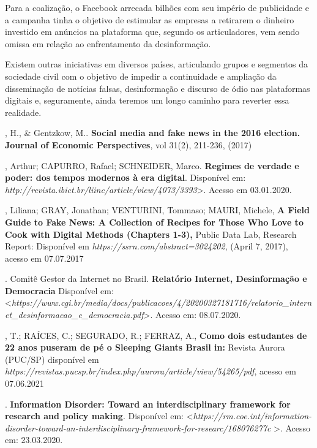 Para a coalização, o Facebook arrecada bilhões com seu império de
publicidade e a campanha tinha o objetivo de estimular as empresas a
retirarem o dinheiro investido em anúncios na plataforma que, segundo os
articuladores, vem sendo omissa em relação ao enfrentamento da
desinformação.

Existem outras iniciativas em diversos países, articulando grupos e
segmentos da sociedade civil com o objetivo de impedir a continuidade e
ampliação da disseminação de notícias falsas, desinformação e discurso
de ódio nas plataformas digitais e, seguramente, ainda teremos um longo
caminho para reverter essa realidade.


\begin{bibliohedra}
, H., \& Gentzkow, M.. \textbf{Social media and fake news in the
2016 election. Journal of Economic Perspectives}, vol 31(2), 211-236,
(2017)

, Arthur; CAPURRO, Rafael; SCHNEIDER, Marco. \textbf{Regimes de
verdade e poder: dos tempos modernos à era digital}. Disponível em:
\textit{http://revista.ibict.br/liinc/article/view/4073/3393}\textgreater{}.
Acesso em 03.01.2020.

, Liliana; GRAY, Jonathan; VENTURINI, Tommaso; MAURI, Michele,
\textbf{A Field Guide to Fake News: A Collection of Recipes for Those
Who Love to Cook with Digital Methods (Chapters 1-3),} Public Data Lab,
Research Report: Disponível em
\textit{https://ssrn.com/abstract=3024202},
(April 7, 2017), acesso em 07.07.2017

. Comitê Gestor da Internet no Brasil. \textbf{Relatório Internet,
Desinformação e Democracia} Disponível em:
\textless{}\textit{https://www.cgi.br/media/docs/publicacoes/4/20200327181716/relatorio\_internet\_desinformacao\_e\_democracia.pdf}\textgreater{}.
Acesso em: 08.07.2020.

, T.; RAÍCES, C.; SEGURADO, R.; FERRAZ, A., \textbf{Como dois
estudantes de 22 anos puseram de pé o Sleeping Giants Brasil in:}
Revista Aurora (PUC/SP) disponível em \textit{https://revistas.pucsp.br/index.php/aurora/article/view/54265/pdf},
acesso em 07.06.2021

. \textbf{Information Disorder: Toward an
interdisciplinary framework for research and policy making}. Disponível
em:
\textless{}\textit{https://rm.coe.int/information-disorder-toward-an-interdisciplinary-framework-for-researc/168076277c}
\textgreater{}. Acesso em: 23.03.2020.


\end{bibliohedra}
